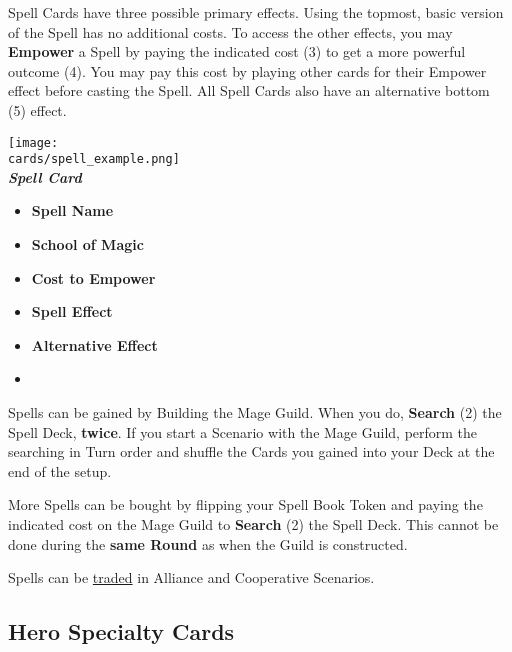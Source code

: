 \begin{multicols*}{2}
Spell Cards have three possible primary effects.
Using the topmost, basic version of the Spell has no additional costs.
To access the other effects, you may \textbf{Empower} a Spell by paying the indicated cost (3) to get a more powerful outcome (4).
You may pay this cost by playing other cards for their Empower  effect before casting the Spell.
All Spell Cards also have an alternative bottom (5)  effect.\par

\filbreak
\begin{center}
  \texttt{[image: \\cards/spell\_example.png]}\\
  \medskip
  \footnotesize{\textbf{\textit{\textcolor{darkcandyapplered}{Spell Card}}}}
  \scriptsize
  \begin{multicols}{2}
    \begin{itemize}[itemsep=5pt]
      \item[\textbf{1.}] \textbf{Spell Name}
      \item[\textbf{2.}] \textbf{School of Magic}
      \item[\textbf{3.}] \textbf{Cost to Empower}
      \item[\textbf{4.}] \textbf{Spell Effect}
      \item[\textbf{5.}] \textbf{Alternative Effect}
      \item[]
    \end{itemize}
  \end{multicols}
\end{center}

\par
Spells can be gained by Building the Mage Guild.
When you do, \textbf{Search} (2) the Spell Deck, \textbf{twice}.
If you start a Scenario with the Mage Guild, perform the searching in Turn order and shuffle the Cards you gained into your Deck at the end of the setup.\par
More Spells can be bought by flipping your Spell Book Token and paying the indicated cost on the Mage Guild to \textbf{Search} (2) the Spell Deck.
This cannot be done during the \textbf{same Round} as when the Guild is constructed.\par
Spells can be \hyperlink{Trading}{traded} in Alliance and Cooperative Scenarios.

\subsection*{\hypertarget{Specialty}{Hero Specialty Cards}}


\end{multicols*}
